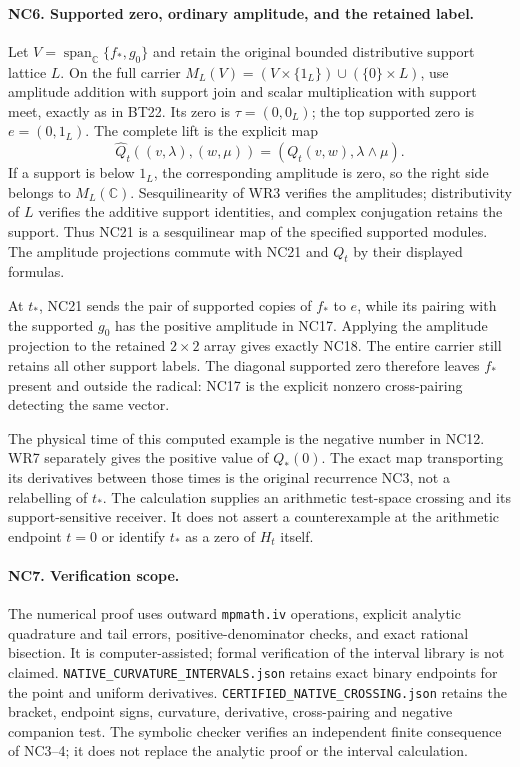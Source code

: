 \documentclass[11pt,a4paper]{article}
\theoremstyle{definition}\newtheorem{definition}[theorem]{Definition}
\begin{document}
\paragraph{NC6. Supported zero, ordinary amplitude, and the retained label.}
Let $V=\operatorname{span}_{\mathbb C}\{f_*,g_0\}$ and retain the
original bounded distributive support lattice $L$. On the full
carrier $M_L(V)=(V\times\{1_L\})\cup(\{0\}\times L)$, use amplitude
addition with support join and scalar multiplication with support
meet, exactly as in BT22. Its zero is $\tau=(0,0_L)$; the top
supported zero is $e=(0,1_L)$. The complete lift is the explicit map
\[
 \widehat Q_t((v,\lambda),(w,\mu))
       =(Q_t(v,w),\lambda\wedge\mu).
 \tag{NC21}
\]
If a support is below $1_L$, the corresponding amplitude is zero,
so the right side belongs to $M_L(\mathbb C)$. Sesquilinearity
of WR3 verifies the amplitudes; distributivity of $L$ verifies
the additive support identities, and complex conjugation retains
the support. Thus NC21 is a sesquilinear map of the specified
supported modules. The amplitude projections commute with NC21
and $Q_t$ by their displayed formulas.

At $t_*$, NC21 sends the pair of supported copies of $f_*$ to $e$,
while its pairing with the supported $g_0$ has the positive amplitude
in NC17. Applying the amplitude projection to the retained
$2\times2$ array gives exactly NC18. The entire carrier still retains
all other support labels. The diagonal supported zero therefore
leaves $f_*$ present and outside the radical: NC17 is the explicit
nonzero cross-pairing detecting the same vector.

The physical time of this computed example is the negative number
in NC12. WR7 separately gives the positive value of $Q_*(0)$.
The exact map transporting its derivatives between those times is
the original recurrence NC3, not a relabelling of $t_*$. The
calculation supplies an arithmetic test-space crossing and its
support-sensitive receiver. It does not assert a counterexample
at the arithmetic endpoint $t=0$ or identify $t_*$ as a zero of
$H_t$ itself.

\paragraph{NC7. Verification scope.}
The numerical proof uses outward \texttt{mpmath.iv} operations,
explicit analytic quadrature and tail errors, positive-denominator
checks, and exact rational bisection. It is computer-assisted;
formal verification of the interval library is not claimed.
\texttt{NATIVE\_CURVATURE\_INTERVALS.json} retains exact binary
endpoints for the point and uniform derivatives.
\texttt{CERTIFIED\_NATIVE\_CROSSING.json} retains the bracket,
endpoint signs, curvature, derivative, cross-pairing and negative
companion test. The symbolic checker verifies an independent
finite consequence of NC3--4; it does not replace the analytic
proof or the interval calculation.
\end{document}
